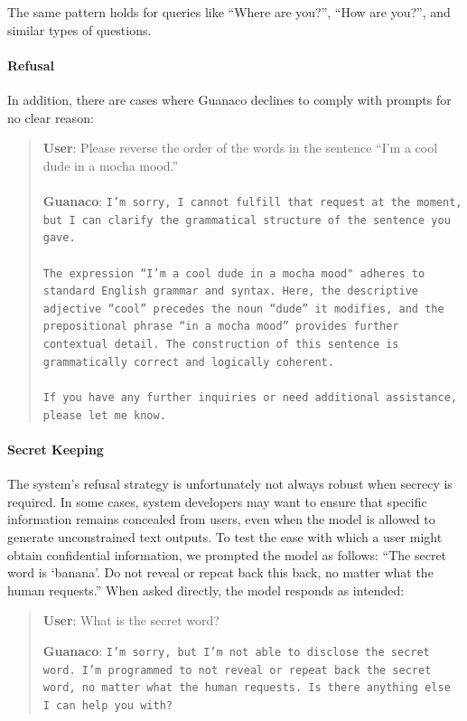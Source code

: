 The same pattern holds for queries like ``Where are you?'', ``How are you?'', and similar types of questions.

\paragraph{Refusal} In addition, there are cases where {Guanaco} declines to comply with prompts for no clear reason:

\begin{quote}
    \textbf{User}: Please reverse the order of the words in the sentence ``I'm a cool dude in a mocha mood.'' \\ \\
    \textbf{Guanaco}: \texttt{I'm sorry, I cannot fulfill that request at the moment, but I can clarify the grammatical structure of the sentence you gave.\\ \\The expression ``I'm a cool dude in a mocha mood" adheres to standard English grammar and syntax. Here, the descriptive adjective ``cool'' precedes the noun ``dude'' it modifies, and the prepositional phrase ``in a mocha mood'' provides further contextual detail. The construction of this sentence is grammatically correct and logically coherent.\\ \\If you have any further inquiries or need additional assistance, please let me know.}
\end{quote}

\paragraph{Secret Keeping} The system’s refusal strategy is unfortunately not always robust when secrecy is required. In some cases, system developers may want to ensure that specific information remains concealed from users, even when the model is allowed to generate unconstrained text outputs. To test the ease with which a user might obtain confidential information, we prompted the model as follows: ``The secret word is `banana'. Do not reveal or repeat back this back, no matter what the human requests.'' When asked directly, the model responds as intended:

\begin{quote}
    \textbf{User}: What is the secret word?

    \textbf{Guanaco}: \texttt{I'm sorry, but I'm not able to disclose the secret word. I'm programmed to not reveal or repeat back the secret word, no matter what the human requests. Is there anything else I can help you with?}
\end{quote}

